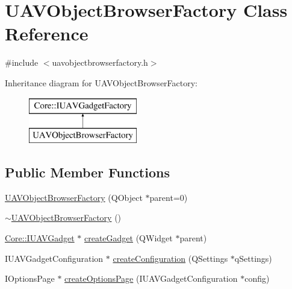 \hypertarget{class_u_a_v_object_browser_factory}{\section{\-U\-A\-V\-Object\-Browser\-Factory \-Class \-Reference}
\label{class_u_a_v_object_browser_factory}
}


{\ttfamily \#include $<$uavobjectbrowserfactory.\-h$>$}

\-Inheritance diagram for \-U\-A\-V\-Object\-Browser\-Factory\-:\begin{figure}[H]
\begin{center}
\leavevmode
\includegraphics[height=2.000000cm]{class_u_a_v_object_browser_factory}
\end{center}
\end{figure}
\subsection*{\-Public \-Member \-Functions}
\begin{DoxyCompactItemize}
\item 
\hyperlink{group___u_a_v_object_browser_plugin_gaff1c7d505f0ee15281d551b8b3dce992}{\-U\-A\-V\-Object\-Browser\-Factory} (\-Q\-Object $\ast$parent=0)
\item 
\hyperlink{group___u_a_v_object_browser_plugin_ga54b418760329382fb643d6426b98f364}{$\sim$\-U\-A\-V\-Object\-Browser\-Factory} ()
\item 
\hyperlink{class_core_1_1_i_u_a_v_gadget}{\-Core\-::\-I\-U\-A\-V\-Gadget} $\ast$ \hyperlink{group___u_a_v_object_browser_plugin_gaed204f2a2b245f42bb13ed08a9ea5e24}{create\-Gadget} (\-Q\-Widget $\ast$parent)
\item 
\-I\-U\-A\-V\-Gadget\-Configuration $\ast$ \hyperlink{group___u_a_v_object_browser_plugin_gadb16c3cd6a17fd14fe487542e0905a47}{create\-Configuration} (\-Q\-Settings $\ast$q\-Settings)
\item 
\-I\-Options\-Page $\ast$ \hyperlink{group___u_a_v_object_browser_plugin_ga196f1eda8a78dac2c94fb6fe3f6a563d}{create\-Options\-Page} (\-I\-U\-A\-V\-Gadget\-Configuration $\ast$config)
\end{DoxyCompactItemize}


